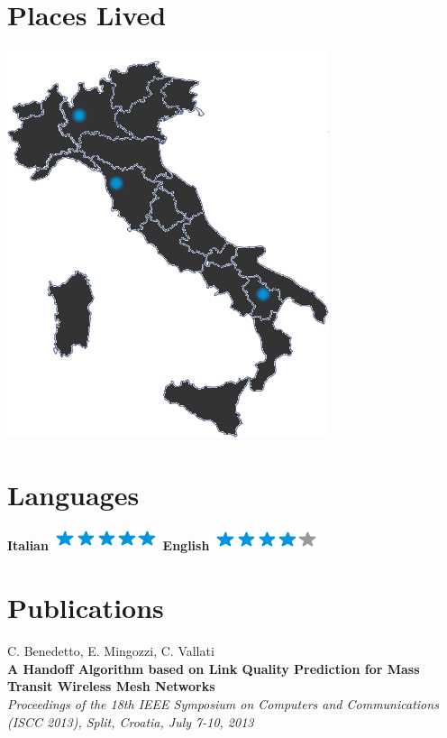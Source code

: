 \documentclass[]{friggeri-cv}
\begin{document}
\begin{aside}
~
~
~
  \section{Places Lived}
    \includegraphics[scale=0.25]{img/italia.png}
    ~
  \section{Languages}
    \textbf{Italian}\includegraphics[scale=0.40]{img/5stars.png}
    \textbf{English}\includegraphics[scale=0.40]{img/4stars.png}
\end{aside}

\section{Publications}
C. Benedetto, E. Mingozzi, C. Vallati\\
\textbf{A Handoff Algorithm based on Link Quality Prediction for Mass Transit Wireless Mesh Networks}\\
\emph{Proceedings of the 18th IEEE Symposium on Computers and Communications (ISCC 2013), Split, Croatia, July 7-10, 2013}
\\
\end{document}
